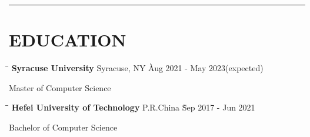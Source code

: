 \documentclass{res}
\begin{document}
 


\address{Syracuse, NY $|$ \href{mailto:wangtzuhsiang@gmail.com}{wangtzuhsiang@gmail.com} 
        $|$ \href{https://github.com/DolorHunter}{github.com/DolorHunter} 
        $|$ \href{https://dolorhunter.com}{dolorhunter.com}}

\begin{resume}

\vspace{-12pt}
\noindent\rule[0.25\baselineskip]{\textwidth}{1pt}    
\vspace{-20pt}  

\vspace{-0.1in}
\section{EDUCATION} 
    \vspace{-0.1in}	 
    \begin{tabbing}
    \hspace{3in}\= \hspace{2in}\= \kill %
    {\bf Syracuse University} \>Syracuse, NY \` Aug 2021 - May 2023(expected)
    \end{tabbing}\vspace{-20pt}      %
    Master of Computer Science      

    \vspace{-0.2in}	 
    \begin{tabbing}
    \hspace{3in}\= \hspace{2in}\= \kill %
    {\bf Hefei University of Technology} \>P.R.China \` Sep 2017 - Jun 2021
    \end{tabbing}\vspace{-20pt}      %
    Bachelor of Computer Science   

\vspace{-0.12in}

\end{resume}
\end{document}
